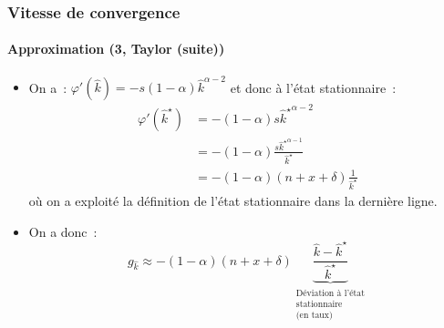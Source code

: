 \documentclass[10pt,notheorems]{beamer}
\theoremstyle{plain}
\theoremstyle{definition} %
\begin{document}
\begin{frame}
  \frametitle{Vitesse de convergence}
  \framesubtitle{Approximation (3, Taylor (suite))}

  \begin{itemize}

  \item On a~: $\varphi'(\hat k) = -s(1-\alpha)\hat k^{\alpha-2}$ et donc à l'état stationnaire~:
    \[
      \begin{split}
        \varphi'(\hat k^{\star}) &= -(1-\alpha) s \left. \hat k^\star \right. ^{\alpha-2}\\
                         &= -(1-\alpha) \frac{s \left. \hat k^\star \right. ^{\alpha-1}}{\hat k^\star}\\
                         &= -(1-\alpha)(n+x+\delta)\frac{1}{\hat k^\star}
      \end{split}
    \]
    où on a exploité la définition de l'état stationnaire dans la dernière ligne.\newline

  \item On a donc~:
    \[
      g_{\hat k} \approx -(1-\alpha)(n+x+\delta)\underbrace{\frac{\hat k - \hat k^{\star}}{\hat k^\star}}_{\substack{\text{Déviation à l'état}\\ \text{stationnaire}\\ \text{(en taux)}}}
    \]

  \end{itemize}

\end{frame}
\end{document}
